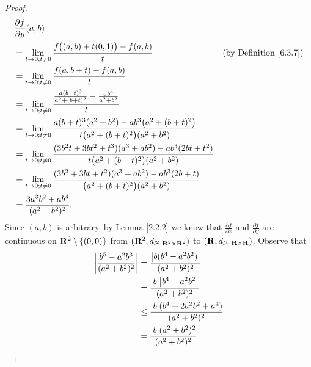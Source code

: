 \begin{proof}
\begin{align*}
         & \frac{\partial f}{\partial y}(a, b)                                                                                                                                          \\
         & = \lim_{t \to 0 ; t \neq 0} \frac{f\big((a, b) + t(0, 1)\big) - f(a, b)}{t}                                                             & \text{(by Definition \ref{6.3.7})} \\
         & = \lim_{t \to 0 ; t \neq 0} \frac{f(a, b + t) - f(a, b)}{t}                                                                                                                  \\
         & = \lim_{t \to 0 ; t \neq 0} \frac{\frac{a (b + t)^3}{a^2 + (b + t)^2} - \frac{ab^3}{a^2 + b^2}}{t}                                                                           \\
         & = \lim_{t \to 0 ; t \neq 0} \frac{a (b + t)^3 (a^2 + b^2) - a b^3 \big(a^2 + (b + t)^2\big)}{t \big(a^2 + (b + t)^2\big) (a^2 + b^2)}                                        \\
         & = \lim_{t \to 0 ; t \neq 0} \frac{(3 b^2 t + 3 b t^2 + t^3) (a^3 + a b^2) - a b^3 (2bt + t^2)}{t \big(a^2 + (b + t)^2\big) (a^2 + b^2)}                                      \\
         & = \lim_{t \to 0 ; t \neq 0} \frac{(3 b^2 + 3 b t + t^2) (a^3 + a b^2) - a b^3 (2b + t)}{\big(a^2 + (b + t)^2\big) (a^2 + b^2)}                                               \\
         & = \frac{3 a^3 b^2 + a b^4}{(a^2 + b^2)^2}.
    \end{align*}
    Since \((a, b)\) is arbitrary, by Lemma \ref{2.2.2} we know that \(\frac{\partial f}{\partial x}\) and \(\frac{\partial f}{\partial y}\) are continuous on \(\mathbf{R}^2 \setminus \{(0, 0)\}\) from \((\mathbf{R}^2, d_{l^2}|_{\mathbf{R}^2 \times \mathbf{R}^2})\) to \((\mathbf{R}, d_{l^1}|_{\mathbf{R} \times \mathbf{R}})\).
    Observe that
    \begin{align*}
        \abs{\frac{b^5 - a^2 b^3}{(a^2 + b^2)^2}} & = \frac{\abs{b (b^4 - a^2 b^2)}}{(a^2 + b^2)^2}            \\
                                                  & = \frac{\abs{b} \abs{b^4 - a^2 b^2}}{(a^2 + b^2)^2}        \\
                                                  & \leq \frac{\abs{b} (b^4 + 2 a^2 b^2 + a^4)}{(a^2 + b^2)^2} \\
                                                  & = \frac{\abs{b} (a^2 + b^2)^2}{(a^2 + b^2)^2}              \\

\end{align*}
\end{proof}
